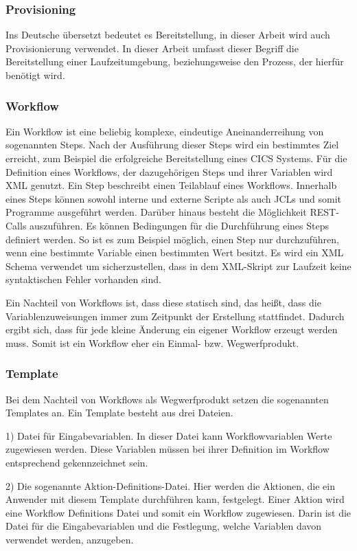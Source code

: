 \subsubsection{Provisioning}
Ins Deutsche übersetzt bedeutet es Bereitstellung, in dieser Arbeit wird auch Provisionierung verwendet.
In dieser Arbeit umfasst dieser Begriff die Bereitstellung einer Laufzeitumgebung, beziehungsweise den Prozess, der hierfür benötigt wird.

\subsubsection{Workflow}\label{sssec:workflow}
Ein Workflow ist eine beliebig komplexe, eindeutige Aneinanderreihung von sogenannten Steps.
Nach der Ausführung dieser Steps wird ein bestimmtes Ziel erreicht, zum Beispiel die erfolgreiche Bereitstellung eines CICS Systems.
Für die Definition eines Workflows, der dazugehörigen Steps und ihrer Variablen wird XML genutzt.
Ein Step beschreibt einen Teilablauf eines Workflows.
Innerhalb eines Steps können sowohl interne und externe Scripte als auch JCLs und somit Programme ausgeführt werden.
Darüber hinaus besteht die Möglichkeit REST-Calls auszuführen.
Es können Bedingungen für die Durchführung eines Steps definiert werden.
So ist es zum Beispiel möglich, einen Step nur durchzuführen, wenn eine bestimmte Variable einen bestimmten Wert besitzt.
Es wird ein XML Schema verwendet um sicherzustellen, dass in dem XML-Skript zur Laufzeit keine syntaktischen Fehler vorhanden sind.
\cite{Rotthove.2018}

Ein Nachteil von Workflows ist, dass diese statisch sind, das heißt, dass die Variablenzuweisungen immer zum Zeitpunkt der Erstellung stattfindet.
Dadurch ergibt sich, dass für jede kleine Änderung ein eigener Workflow erzeugt werden muss.
Somit ist ein Workflow eher ein Einmal- bzw. Wegwerfprodukt.

\subsubsection{Template}
Bei dem Nachteil von Workflows als Wegwerfprodukt setzen die sogenannten Templates an.
Ein Template besteht aus drei Dateien.

1) Datei für Eingabevariablen.
In dieser Datei kann Workflowvariablen Werte zugewiesen werden.
Diese Variablen müssen bei ihrer Definition im Workflow entsprechend gekennzeichnet sein.

2) Die sogenannte Aktion-Definitions-Datei.
Hier werden die Aktionen, die ein Anwender mit diesem Template durchführen kann, festgelegt.
Einer Aktion wird eine Workflow Definitions Datei und somit ein Workflow zugewiesen.
Darin ist die Datei für die Eingabevariablen und die Festlegung, welche Variablen davon verwendet werden, anzugeben.

